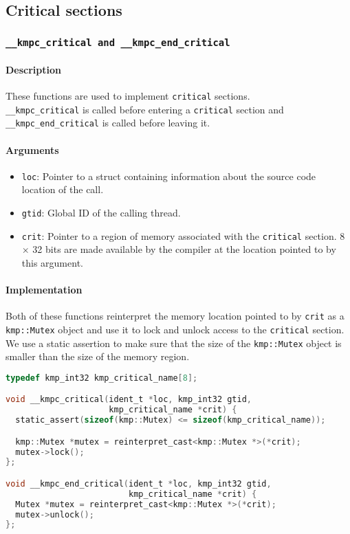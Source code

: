 \subsection{Critical sections}

\subsubsection{\texttt{__kmpc_critical and __kmpc_end_critical}}

\paragraph{Description} These functions are used to implement \texttt{critical} sections.\\
\texttt{\_\_kmpc\_critical} is called before entering a \texttt{critical} section and
\texttt{\_\_kmpc\_end\_critical} is called before leaving it.

\paragraph{Arguments}
\begin{itemize}
	\item \texttt{loc}: Pointer to a struct containing information about the source code location
	      of the call.
	\item \texttt{gtid}: Global ID of the calling thread.
	\item \texttt{crit}: Pointer to a region of memory associated with the \texttt{critical} section. 8
	      $\times$ 32 bits are made available by the compiler at the location pointed to by this
	      argument.
\end{itemize}

\paragraph{Implementation} Both of these functions reinterpret the memory location pointed to by
\texttt{crit} as a \texttt{kmp::Mutex} object and use it to lock and unlock access to the
\texttt{critical} section. We use a static assertion to make sure that the size of the
\texttt{kmp::Mutex} object is smaller than the size of the memory region.

\begin{lstlisting}[language=C, caption={__kmpc_critical and __kmpc_end_critical},
                   label={lst:kmpc-critical}, escapechar=@]
typedef kmp_int32 kmp_critical_name[8];

void __kmpc_critical(ident_t *loc, kmp_int32 gtid,
                     kmp_critical_name *crit) {
  static_assert(sizeof(kmp::Mutex) <= sizeof(kmp_critical_name));

  kmp::Mutex *mutex = reinterpret_cast<kmp::Mutex *>(*crit);
  mutex->lock();
};

void __kmpc_end_critical(ident_t *loc, kmp_int32 gtid,
                         kmp_critical_name *crit) {
  Mutex *mutex = reinterpret_cast<kmp::Mutex *>(*crit);
  mutex->unlock();
};
\end{lstlisting}

